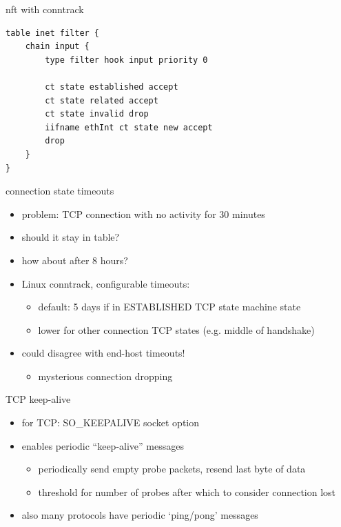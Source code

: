 \begin{frame}[fragile]{nft with conntrack}
\begin{Verbatim}
table inet filter {
    chain input {
        type filter hook input priority 0

        ct state established accept
        ct state related accept
        ct state invalid drop
        iifname ethInt ct state new accept
        drop
    }
}
\end{Verbatim}
\end{frame}

\begin{frame}{connection state timeouts}
    \begin{itemize}
    \item problem: TCP connection with no activity for 30 minutes
    \item should it stay in table?
    \item how about after 8 hours?
    \vspace{.5cm}
    \item Linux conntrack, configurable timeouts:
        \begin{itemize}
        \item default: 5 days if in ESTABLISHED TCP state machine state
        \item lower for other connection TCP states (e.g. middle of handshake)
        \end{itemize}
    \item could disagree with end-host timeouts!
        \begin{itemize}
        \item mysterious connection dropping
        \end{itemize}
    \end{itemize}
\end{frame}

\begin{frame}{TCP keep-alive}
    \begin{itemize}
    \item for TCP: SO\_KEEPALIVE socket option
    \item enables periodic ``keep-alive'' messages
        \begin{itemize}
        \item periodically send empty probe packets, resend last byte of data
        \item threshold for number of probes after which to consider connection lost
        \end{itemize}
    \vspace{.5cm}
    \item also many protocols have periodic `ping/pong' messages
    \end{itemize}
\end{frame}
